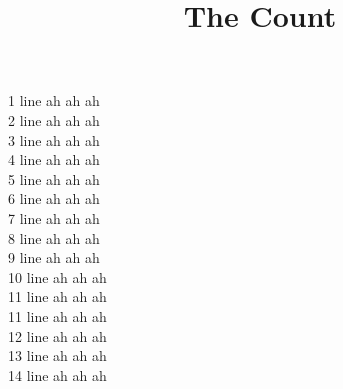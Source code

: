 \documentclass{ximera}
\title{The Count}
\begin{document}
1 line ah ah ah \\
2 line ah ah ah \\
3 line ah ah ah \\
4 line ah ah ah \\
5 line ah ah ah \\
6 line ah ah ah \\
7 line ah ah ah \\
8 line ah ah ah \\
9 line ah ah ah \\
10 line ah ah ah \\
11 line ah ah ah \\
11 line ah ah ah \\
12 line ah ah ah \\
13 line ah ah ah \\
14 line ah ah ah \\
\end{document}
